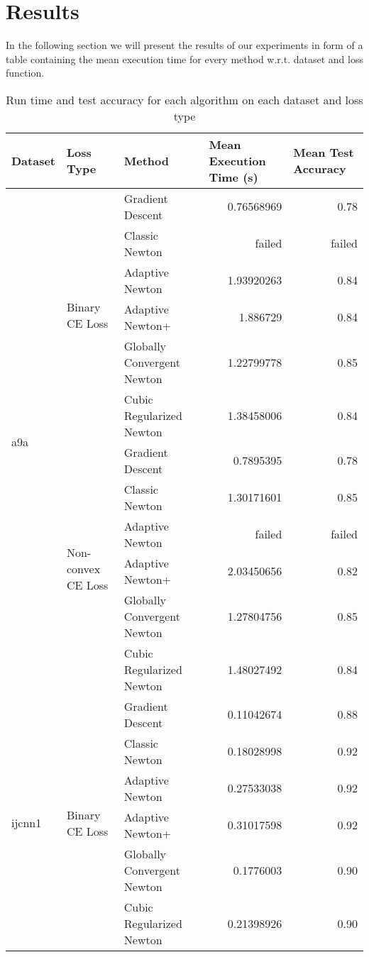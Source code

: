 \documentclass{article}
\begin{document}
\section{Results}
In the following section we will present the results of our experiments in form of a table containing the mean execution time for every method w.r.t. dataset and loss function.
\begin{table}[ht]
  \centering
  \caption{Run time and test accuracy for each algorithm on each dataset and loss type}
  \label{tab:results}
  \begin{tabular}{lllr@{}r}
    \toprule
    Dataset & Loss Type & Method & \multicolumn{1}{l}{Mean Execution Time (s)} & \multicolumn{1}{l}{Mean Test Accuracy} \\
    \midrule
    \multirow{12}{*}{a9a} 
      & \multirow{6}{*}{Binary CE Loss}
        & Gradient Descent & 0.76568969 & 0.78 \\
        & & Classic Newton & failed & failed \\
        & & Adaptive Newton & 1.93920263 & 0.84 \\
        & & Adaptive Newton+ & 1.886729 & 0.84 \\
        & & Globally Convergent Newton & 1.22799778 & 0.85 \\
        & & Cubic Regularized Newton & 1.38458006 & 0.84 \\
      & \multirow{6}{*}{Non-convex CE Loss}
        & Gradient Descent & 0.7895395 & 0.78 \\
        & & Classic Newton & 1.30171601 & 0.85 \\
        & & Adaptive Newton & failed & failed \\
        & & Adaptive Newton+ & 2.03450656 & 0.82 \\
        & & Globally Convergent Newton & 1.27804756 & 0.85 \\
        & & Cubic Regularized Newton & 1.48027492 & 0.84 \\
    \midrule
    \multirow{12}{*}{ijcnn1}
      & \multirow{6}{*}{Binary CE Loss}
        & Gradient Descent & 0.11042674 & 0.88 \\
        & & Classic Newton & 0.18028998 & 0.92 \\
        & & Adaptive Newton & 0.27533038 & 0.92 \\
        & & Adaptive Newton+ & 0.31017598 & 0.92 \\
        & & Globally Convergent Newton & 0.1776003 & 0.90 \\
        & & Cubic Regularized Newton & 0.21398926 & 0.90 \\

\end{tabular}
\end{table}
\end{document}
